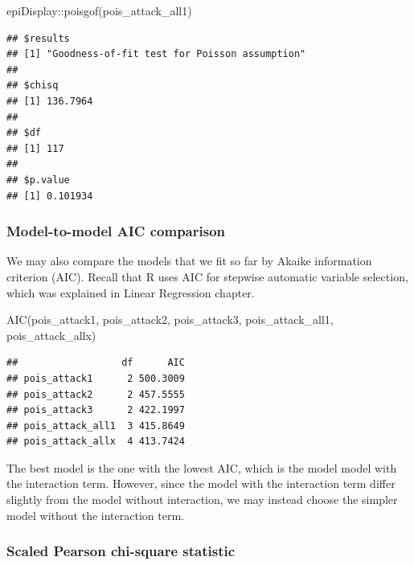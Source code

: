 \documentclass[
  10pt,
]{krantz}
\newenvironment{Shaded}{\begin{snugshade}}{\end{snugshade}}
\newcommand{\FunctionTok}[1]{\textcolor[rgb]{0.00,0.00,0.00}{#1}}
\newcommand{\NormalTok}[1]{#1}
\newcommand{\SpecialCharTok}[1]{\textcolor[rgb]{0.00,0.00,0.00}{#1}}
\begin{document}
\begin{Shaded}
\begin{Highlighting}[]
\NormalTok{epiDisplay}\SpecialCharTok{::}\FunctionTok{poisgof}\NormalTok{(pois\_attack\_all1)}
\end{Highlighting}
\end{Shaded}

\begin{verbatim}
## $results
## [1] "Goodness-of-fit test for Poisson assumption"
## 
## $chisq
## [1] 136.7964
## 
## $df
## [1] 117
## 
## $p.value
## [1] 0.101934
\end{verbatim}

\hypertarget{model-to-model-aic-comparison}{%
\subsubsection*{\texorpdfstring{Model-to-model AIC comparison}{Model-to-model AIC comparison}}\label{model-to-model-aic-comparison}}


We may also compare the models that we fit so far by Akaike information criterion (AIC). Recall that R uses AIC for stepwise automatic variable selection, which was explained in Linear Regression chapter.

\begin{Shaded}
\begin{Highlighting}[]
\FunctionTok{AIC}\NormalTok{(pois\_attack1, pois\_attack2, pois\_attack3, }
\NormalTok{    pois\_attack\_all1, pois\_attack\_allx)}
\end{Highlighting}
\end{Shaded}

\begin{verbatim}
##                  df      AIC
## pois_attack1      2 500.3009
## pois_attack2      2 457.5555
## pois_attack3      2 422.1997
## pois_attack_all1  3 415.8649
## pois_attack_allx  4 413.7424
\end{verbatim}

The best model is the one with the lowest AIC, which is the model model with the interaction term. However, since the model with the interaction term differ slightly from the model without interaction, we may instead choose the simpler model without the interaction term.

\hypertarget{scaled-pearson-chi-square-statistic}{%
\subsubsection*{Scaled Pearson chi-square statistic}\label{scaled-pearson-chi-square-statistic}}
\end{document}
